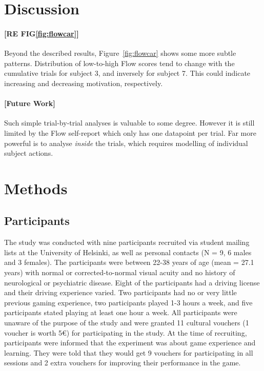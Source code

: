 \documentclass[fleqn,10pt]{wlscirep}
\begin{document}
\section*{Discussion}

\paragraph{[RE FIG\ref{fig:flowcar}]}
Beyond the described results, Figure~\ref{fig:flowcar} shows some more subtle patterns. Distribution of low-to-high Flow scores tend to change with the cumulative trials for subject 3, and inversely for subject 7. This could indicate increasing and decreasing motivation, respectively.

\paragraph{[Future Work]}
Such simple trial-by-trial analyses is valuable to some degree. However it is still limited by the Flow self-report which only has one datapoint per trial. Far more powerful is to analyse {\it inside} the trials, which requires modelling of individual subject actions. %

\section*{Methods}

\subsection*{Participants}
The study was conducted with nine participants recruited via student mailing lists at the University of Helsinki, as well as personal contacts (N = 9, 6 males and 3 females). The participants were between 22-38 years of age (mean = 27.1 years) with normal or corrected-to-normal visual acuity and no history of neurological or psychiatric disease. Eight of the participants had a driving license and their driving experience varied. Two participants had no or very little previous gaming experience, two participants played 1-3 hours a week, and five participants stated playing at least one hour a week. All participants were unaware of the purpose of the study and were granted 11 cultural vouchers (1 voucher is worth 5€) for participating in the study. At the time of recruiting, participants were informed that the experiment was about game experience and learning. They were told that they would get 9 vouchers for participating in all sessions and 2 extra vouchers for improving their performance in the game.
\end{document}
